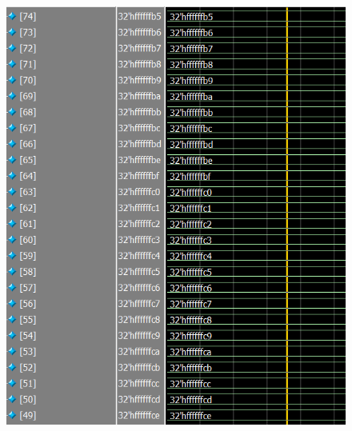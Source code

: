 \documentclass[conference]{IEEEtran}
\begin{document}
	\begin{figure}[H]
		\centering
		\includegraphics[width=\columnwidth]{Files/full_mem_val7}
		\caption{}
		\label{fig:fullmemval7}
	\end{figure}
	
\end{document}
